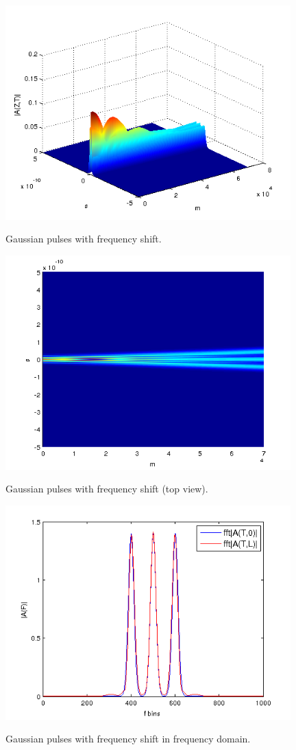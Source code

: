\documentclass[a4paper,10pt]{report}
\begin{document}
\begin{figure}[!ht]
  \centering
  \includegraphics[width=11cm]{es8_3.png}\\
  \caption{Gaussian pulses with frequency shift.}
  \label{es8_3}
\end{figure}

\begin{figure}[!ht]
  \centering
  \includegraphics[width=11cm]{es8_4.png}\\
  \caption{Gaussian pulses with frequency shift (top view).}
  \label{es8_4}
\end{figure}

\begin{figure}[!ht]
  \centering
  \includegraphics[width=11cm]{es8_f2.png}\\
  \caption{Gaussian pulses with frequency shift in frequency domain.}
  \label{es8_f2}
\end{figure}
\end{document}
